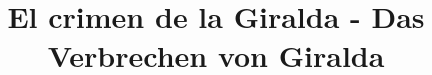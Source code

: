 \documentclass[a4paper, pagesize, DIV=14, fontsize=10pt, parskip=half, oneside, BCOR=5mm]{scrartcl}
\begin{document}
\title{El crimen de la Giralda - Das Verbrechen von Giralda }
\date{}

\maketitle

\newcommand{\rn}[1]{\Rnode{#1}}
\newcommand{\rl}[2]{\ncline[linestyle=solid,arrows=->,nodesepA=0.5pt,linecolor=gray, strokeopacity=0.5]{#1}{#2}}
\newcommand{\sidenote}[1]{\marginpar[#1]{#1}}
\newcommand{\ul}[1]{\underline{#1}}


\end{document}
